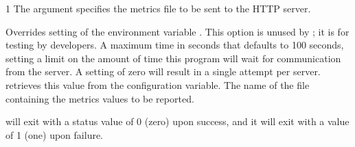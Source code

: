 \begin{ManPage}{\label{man-condor-dagman-metrics-reporter}}{1}
The  argument specifies the metrics file to be sent
to the HTTP server.

\begin{Options}
     {Overrides setting of the environment variable
     . 
     This option is unused by ; it is for testing by developers.}
    {A maximum time in seconds that defaults to 100 seconds,
    setting a limit on the amount of time this program will wait for
    communication from the server.  
    A setting of zero will result in a single attempt per server. 
     retrieves this value from the 
     configuration variable.}
    {The name of the file containing the metrics values to be reported.}
\end{Options}

\ExitStatus

 will exit with a status value of 0 (zero)
 upon success,
and it will exit with a value of 1 (one) upon failure.

\end{ManPage}

